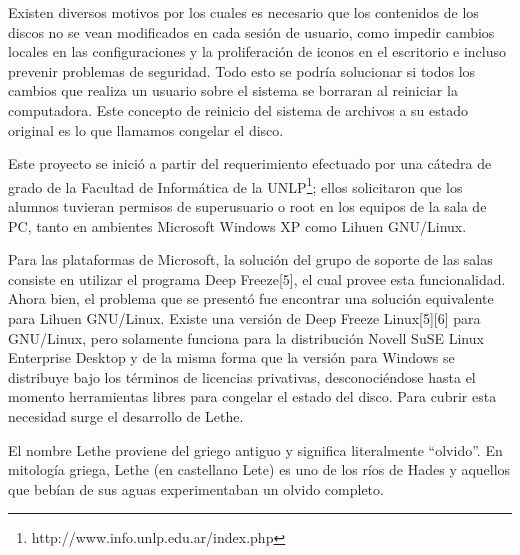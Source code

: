 \documentclass[final,narroweqnarray,inline,twoside]{ieee}
\newcommand{\itref}[1]{[{#1}]}
\begin{document}
Existen diversos motivos por los cuales es necesario que los contenidos de los discos no se vean modificados en cada sesión de usuario, como impedir cambios locales en las configuraciones y la proliferación de iconos en el escritorio e incluso prevenir problemas de seguridad. Todo esto se podría solucionar si todos los cambios que realiza un usuario sobre el sistema se borraran al reiniciar la computadora. Este concepto de reinicio del sistema de archivos a su estado original es lo que llamamos congelar el disco.

Este proyecto se inició  a partir del requerimiento efectuado por una cátedra de grado de la Facultad de Informática de la UNLP\footnote{http://www.info.unlp.edu.ar/index.php}; ellos solicitaron que los alumnos tuvieran permisos de superusuario o root en los equipos de la sala de PC, tanto en ambientes Microsoft Windows XP como Lihuen GNU/Linux.

Para las plataformas de Microsoft, la solución del grupo de soporte de las salas consiste en utilizar el programa Deep Freeze\itref{5}, el cual provee esta funcionalidad. Ahora bien, el problema que se presentó fue encontrar una solución equivalente para Lihuen GNU/Linux. Existe una versión de Deep Freeze Linux\itref{5}\itref{6} para GNU/Linux, pero solamente funciona para la distribución Novell SuSE Linux Enterprise Desktop y de la misma forma que la versión para Windows se distribuye bajo los términos de licencias privativas, desconociéndose hasta el momento herramientas libres para congelar el estado del disco. Para cubrir esta necesidad surge el desarrollo de Lethe.

El nombre Lethe  proviene del griego antiguo y significa literalmente ``olvido''. En mitología griega, Lethe (en castellano Lete) es uno de los ríos de Hades y aquellos que bebían de sus aguas experimentaban un olvido completo.
\end{document}
